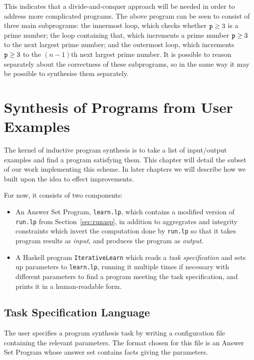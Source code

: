 \documentclass[a4paper,twoside,notitlepage]{report}
\begin{document}
This indicates that a divide-and-conquer approach will be needed in order 
to address more complicated programs. The above program can be seen to 
consist of three main subprograms: the innermost loop, which checks 
whether $\verb|p|\geq3$ is a prime number; the loop containing that, which 
increments a prime number $\verb|p|\geq3$ to the next largest prime 
number; and the outermost loop, which increments $\verb|p|\geq3$ to the 
$(n-1)$th next largest prime number. It is possible to reason separately 
about the correctness of these subprograms, so in the same way it may be 
possible to synthesise them separately.

\chapter{Synthesis of Programs from User Examples} \label{chp:synexm}

The kernel of inductive program synthesis is to take a list of 
input/output examples and find a program satisfying them. This chapter 
will detail the subset of our work implementing this scheme. In later 
chapters we will describe how we built upon the idea to effect 
improvements.

For now, it consists of two components:
\begin{itemize}
    \item An Answer Set Program, \verb|learn.lp|, which contains a 
    modified version of \verb|run.lp| from Section~\ref{sec:runasp}, in 
    addition to aggregrates and integrity constraints which invert the 
    computation done by \verb|run.lp| so that it takes program results as 
    \emph{input}, and produces the program as \emph{output}.

    \item A Haskell program \verb|IterativeLearn| which reads a \emph{task 
    specification} and sets up parameters to \verb|learn.lp|, running it 
    multiple times if necessary with different parameters to find a 
    program meeting the task specification, and prints it in a 
    human-readable form.
\end{itemize}

\section{Task Specification Language} \label{sec:synexm_spclng}
The user specifies a program synthesis task by writing a configuration file 
containing the relevant parameters. The format chosen for this file is an 
Answer Set Program whose answer set contains facts giving the parameters. 
\end{document}
